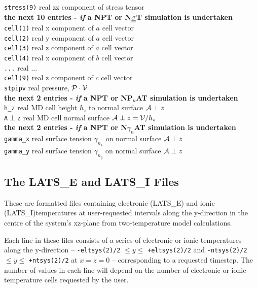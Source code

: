 \begin{tabbing}
\> {\tt stress(9)} \> real \> zz component of stress tensor \\
{\bf the next 10 entries - {\em if} a NPT or N$\mbox{$\underline{\underline{\bf \sigma}}$}$T simulation is undertaken} \\
\> {\tt cell(1)} \> real   \> x component of $a$ cell vector \\
\> {\tt cell(2)} \> real   \> y component of $a$ cell vector \\
\> {\tt cell(3)} \> real   \> z component of $a$ cell vector \\
\> {\tt cell(4)} \> real   \> x component of $b$ cell vector \\
\> {\tt ...} \> real \> ... \\
\> {\tt cell(9)} \> real   \> z component of $c$ cell vector \\
\> {\tt stpipv} \> real    \> pressure, ${\cal P} \cdot {\cal V}$ \\
{\bf the next 2 entries - {\em if} a NPT or NP$_{n}$AT simulation is undertaken} \\
\> {\tt h\_z}   \> real    \> MD cell height $h_{z}$ to normal surface ${\cal A}\perp{z}$ \\
\> {\tt A$\perp${z}} \> real \> MD cell normal surface ${\cal A}\perp{z}={\cal V}/h_{z}$ \\
{\bf the next 2 entries - {\em if} a NPT or N$\gamma_{n}$AT simulation is undertaken} \\
\> {\tt gamma\_x} \> real \> surface tension $\gamma_{n_{x}}$ on normal surface ${\cal A}\perp{z}$ \\
\> {\tt gamma\_y} \> real \> surface tension $\gamma_{n_{y}}$ on normal surface ${\cal A}\perp{z}$
\end{tabbing}

\subsection{The LATS\_E and LATS\_I Files}
\label{latsei-files}

These are formatted files containing electronic (LATS\_E)
and ionic (LATS\_I)temperatures at user-requested intervals
along the y-direction in the centre of the system's xz-plane
from  two-temperature model
calculations.

Each line in these files consists of a series of electronic or ionic
temperatures along the y-direction -- {\tt -eltsys(2)/2} $\le y \le$ {\tt +eltsys(2)/2}
and {\tt -ntsys(2)/2} $\le y \le$ {\tt +ntsys(2)/2} at $x=z=0$ --
corresponding to a requested timestep. The number of values in
each line will depend on the number of electronic or ionic temperature
cells requested by the user.

